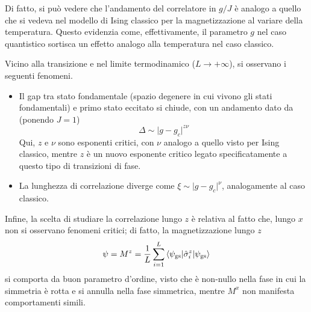 \documentclass[11pt, a4paper]{scrartcl}
\theoremstyle{style}
\theoremstyle{style1}
\numberwithin{equation}{subsection}
\begin{document}
\begin{center}
	\begin{minipage}
		{.45\columnwidth}
	Di fatto, si pu\`o vedere che l'andamento del correlatore in $g / J$ \`e analogo a quello che si vedeva nel modello di Ising classico per la magnetizzazione al variare della temperatura.
	Questo evidenzia come, effettivamente, il parametro $g$ nel caso quantistico sortisca un effetto analogo alla temperatura nel caso classico.
	\end{minipage}
	\hfill
	\begin{minipage}
		{.45\columnwidth}
	\centering
{}
	\end{minipage}
\end{center}
Vicino alla transizione e nel limite termodinamico ($L\to +\infty$), si osservano i seguenti fenomeni.
\begin{itemize}
	\item Il gap tra stato fondamentale (spazio degenere in cui vivono gli stati fondamentali) e primo stato eccitato si chiude, con un andamento dato da (ponendo $J=1$)
		\[
		\Delta \sim \lvert g- g_c \rvert ^{z \nu }
		\] 
	Qui, $z$ e $\nu $ sono esponenti critici, con $\nu $ analogo a quello visto per Ising classico, mentre $z$ \`e un nuovo esponente critico legato specificatamente a questo tipo di transizioni di fase.
\item La lunghezza di correlazione diverge come $\xi \sim \lvert g - g_c \rvert ^{\nu }$, analogamente al caso classico.
\end{itemize}
Infine, la scelta di studiare la correlazione lungo $z$ \`e relativa al fatto che, lungo $x$ non si osservano fenomeni critici; di fatto, la magnetizzazione lungo $z$
\[
\psi = M^z = \frac{1}{L} \sum_{i=1}^{L} \braket{\psi _\text{gs}|\hat{\sigma }^z_i|\psi _\text{gs}} 
\] 
si comporta da buon parametro d'ordine, visto che \`e non-nullo nella fase in cui la simmetria \`e rotta e si annulla nella fase simmetrica, mentre $M^x$ non manifesta comportamenti simili.
\end{document}
